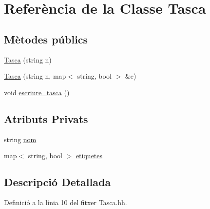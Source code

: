 \hypertarget{class_tasca}{\section{Referència de la Classe Tasca}
\label{class_tasca}
}
\subsection*{Mètodes públics}
\begin{DoxyCompactItemize}
\item 
\hyperlink{class_tasca_a67cd792d19dc4073a940e4d8aa1eea36}{Tasca} (string n)
\item 
\hyperlink{class_tasca_a0ecdf23fc047a638e66206941343da06}{Tasca} (string n, map$<$ string, bool $>$ \&e)
\item 
void \hyperlink{class_tasca_a51a117cee6a0bed1d96e8a890cd42722}{escriure\-\_\-tasca} ()
\end{DoxyCompactItemize}
\subsection*{Atributs Privats}
\begin{DoxyCompactItemize}
\item 
string \hyperlink{class_tasca_a3b35e7db0f140bc6926c321dc5cbe330}{nom}
\item 
map$<$ string, bool $>$ \hyperlink{class_tasca_a02e6c83bd74e95523e8ef9f47b18fa40}{etiquetes}
\end{DoxyCompactItemize}


\subsection{Descripció Detallada}


Definició a la línia 10 del fitxer Tasca.\-hh.



